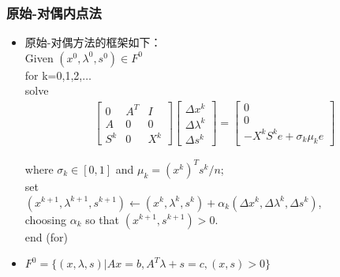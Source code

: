 \documentclass[notheorems,mathserif,table,compress]{beamer}  %
\begin{document}
%
\begin{frame}
\frametitle{原始-对偶内点法}
\begin{itemize}
\item 原始-对偶方法的框架如下：\\
Given $(x^0,\lambda^0,s^0)\in F^0$\\
for k=0,1,2,$\dots$\\
\qquad solve
\begin{eqnarray*}
\begin{bmatrix}
0 & A^T & I\\
A & 0 & 0\\
S^k & 0 & X^k
\end{bmatrix}
\begin{bmatrix}
\Delta x^k\\
\Delta \lambda^k\\
\Delta s^k
\end{bmatrix}=
\begin{bmatrix}
0\\
0\\
-X^kS^ke+\sigma_k\mu_k e
\end{bmatrix}
\end{eqnarray*}

\qquad \qquad where $\sigma_k\in[0,1]$ and $\mu_k=(x^k)^Ts^k/n$;\\
\qquad set \\
\qquad $(x^{k+1},\lambda^{k+1},s^{k+1})\leftarrow(x^k,\lambda^k,s^k)+\alpha_k(\Delta x^k,\Delta \lambda^k,\Delta s^k)$,\\
\qquad \qquad choosing $\alpha_k$ so that $(x^{k+1},s^{k+1})>0$.\\
end (for)\\
\item $F^0=\{(x,\lambda,s)|Ax=b,A^T\lambda+s=c,(x,s)>0\}$
\end{itemize}
\end{frame}
\end{document}
